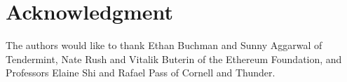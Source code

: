 \documentclass[10pt,journal,compsoc]{IEEEtran}
\begin{document}
  \section*{Acknowledgment}
\fi
The authors would like to thank Ethan Buchman and Sunny Aggarwal of Tendermint, Nate Rush and Vitalik Buterin of the Ethereum Foundation, and Professors Elaine Shi and Rafael Pass of Cornell and Thunder.

\ifCLASSOPTIONcaptionsoff
  \newpage
\fi




\end{document}
